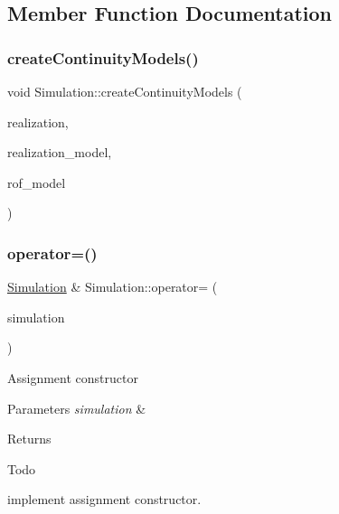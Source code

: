 \subsection{Member Function Documentation}
\mbox{\label{classSimulation_aa2e2863a0038345c46dd827b97008347_aa2e2863a0038345c46dd827b97008347}} 
\subsubsection{\texorpdfstring{create\+Continuity\+Models()}{createContinuityModels()}}
{\footnotesize\ttfamily void Simulation\+::create\+Continuity\+Models (\begin{DoxyParamCaption}\item[{unsigned long}]{realization,  }\item[{\mbox{\hyperlink{classContinuityModelRealization}{Continuity\+Model\+Realization}} $\ast$\&}]{realization\+\_\+model,  }\item[{\mbox{\hyperlink{classContinuityModelROF}{Continuity\+Model\+R\+OF}} $\ast$\&}]{rof\+\_\+model }\end{DoxyParamCaption})}

\mbox{\label{classSimulation_aa9ad48555e93d646d68c0df7a87e2356_aa9ad48555e93d646d68c0df7a87e2356}} 
\subsubsection{\texorpdfstring{operator=()}{operator=()}}
{\footnotesize\ttfamily \mbox{\hyperlink{classSimulation}{Simulation}} \& Simulation\+::operator= (\begin{DoxyParamCaption}\item[{const \mbox{\hyperlink{classSimulation}{Simulation}} \&}]{simulation }\end{DoxyParamCaption})}

Assignment constructor 
\begin{DoxyParams}{Parameters}
{\em simulation} & \\
\hline
\end{DoxyParams}
\begin{DoxyReturn}{Returns}

\end{DoxyReturn}
\begin{DoxyRefDesc}{Todo}
\item[\mbox{\hyperlink{todo__todo000007}{Todo}}]implement assignment constructor. \end{DoxyRefDesc}
\mbox{\label{classSimulation_acfd5f3442b2e6c59eeed6a7b2fabb0f6_acfd5f3442b2e6c59eeed6a7b2fabb0f6}} 
